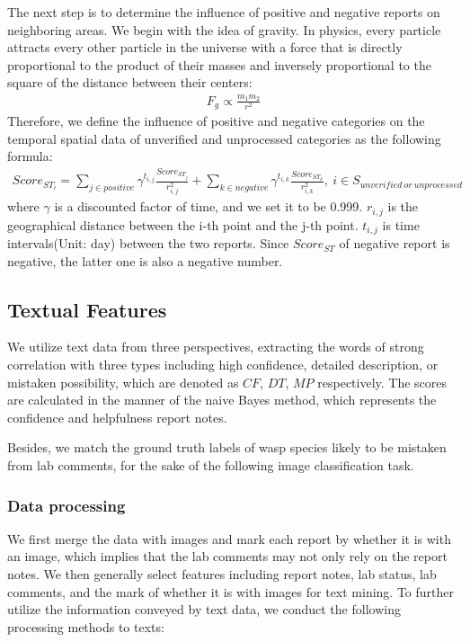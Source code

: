\documentclass{mcmthesis}
\begin{document}
\begin{itemize}
    The next step is to determine the influence of positive and negative reports on neighboring areas. We begin with the idea of gravity. In physics, every particle attracts every other particle in the universe with a force that is directly proportional to the product of their masses and inversely proportional to the square of the distance between their centers:
    \begin{eqnarray}
    F_g\propto \frac{m_1m_2}{r^2} 
    \end{eqnarray}
    Therefore, we define the influence of positive and negative categories on the temporal spatial data of unverified and unprocessed categories as the following formula:
    \begin{eqnarray}
    Score_{ST_i}=\sum_{j\in positive}\gamma^{t_{i,j}}
    \frac{Score_{ST_j}}{r_{i,j}^2}+\sum_{k\in negative}\gamma^{t_{i,k}} \frac{Score_{ST_k}}{r_{i,k}^2},\ i\in S_{unverified\  or\  unprocessed}
    \end{eqnarray}
    where $\gamma$ is a discounted factor of time, and we set it to be 0.999. $r_{i,j}$ is the geographical distance between the i-th point and the j-th point. $t_{i,j}$ is time intervals(Unit: day) between the two reports. Since $Score_{ST}$ of negative report is negative, the latter one is also a negative number.
    
\end{itemize}

\subsection{Textual Features}

We utilize text data from three perspectives, extracting the words of strong correlation with three types including high confidence, detailed description, or mistaken possibility, which are denoted as $CF$, $DT$, $MP$ respectively. The scores are calculated in the manner of the naive Bayes method, which represents the confidence and helpfulness report notes.

Besides, we match the ground truth labels of wasp species likely to be mistaken from lab comments, for the sake of the following image classification task.

\subsubsection{Data processing}

We first merge the data with images and mark each report by whether it is with an image, which implies that the lab comments may not only rely on the report notes. We then generally select features including report notes, lab status, lab comments, and the mark of whether it is with images for text mining. To further utilize the information conveyed by text data, we conduct the following processing methods to texts:
\end{document}
